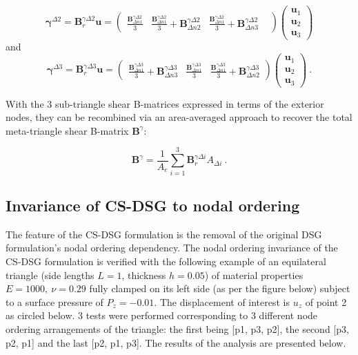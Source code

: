   \begin{equation} 
\boldsymbol{\gamma}^{\Delta 2} =
\mathbf{B}_r^{\gamma\Delta 2}
\mathbf{u}
=
\begin{pmatrix}
\frac{\mathbf{B}_{\Delta n1}^{\gamma\Delta 2}}{3} &
\frac{\mathbf{B}_{\Delta n1}^{\gamma\Delta 2}}{3} + \mathbf{B}_{\Delta n2}^{\gamma\Delta 2} &
\frac{\mathbf{B}_{\Delta n1}^{\gamma\Delta 2}}{3} + \mathbf{B}_{\Delta n3}^{\gamma\Delta 2} &  
\end{pmatrix}
\begin{pmatrix}
\mathbf{u}_1 \\
\mathbf{u}_2 \\
\mathbf{u}_3
\end{pmatrix}
\label{eqCSDSG9}
\end{equation}
and
  \begin{equation} 
\boldsymbol{\gamma}^{\Delta 3} =
\mathbf{B}_r^{\gamma\Delta 3}
\mathbf{u}
=
\begin{pmatrix}
\frac{\mathbf{B}_{\Delta n1}^{\gamma\Delta 3}}{3} + \mathbf{B}_{\Delta n3}^{\gamma\Delta 3} &
\frac{\mathbf{B}_{\Delta n1}^{\gamma\Delta 3}}{3} &
\frac{\mathbf{B}_{\Delta n1}^{\gamma\Delta 3}}{3} + \mathbf{B}_{\Delta n2}^{\gamma\Delta 3}
\end{pmatrix}
\begin{pmatrix}
\mathbf{u}_1 \\
\mathbf{u}_2 \\
\mathbf{u}_3
\end{pmatrix}
\label{eqCSDSG10}\ .
\end{equation}

With the 3 sub-triangle shear B-matrices expressed in terms of the exterior nodes, they can be recombined via an area-averaged approach to recover the total meta-triangle shear B-matrix $\mathbf{B}^{\gamma}$:

\begin{equation} 
\mathbf{B}^{\gamma}
=
\frac{1}{A_e}
\sum_{i=1}^3
\mathbf{B}_r^{\gamma\Delta i}
A_{\Delta i}
\label{eqCSDSG11}\ .
\end{equation}

\subsection{Invariance of CS-DSG to nodal ordering}
The feature of the CS-DSG formulation is the removal of the original DSG formulation's nodal ordering dependency. The nodal ordering invariance of the CS-DSG formulation is verified with the following example of an equilateral triangle (side lengths $L = 1$, thickness $h = 0.05$) of material properties $E = 1000,\ \nu = 0.29$ fully clamped on its left side (as per the figure below) subject to a surface pressure of $P_z = -0.01$. The displacement of interest is $u_z$ of point 2 as circled below. 3 tests were performed corresponding to 3 different node ordering arrangements of the triangle: the first being [p1, p3, p2], the second [p3, p2, p1] and the last [p2, p1, p3]. The results of the analysis are presented below.

